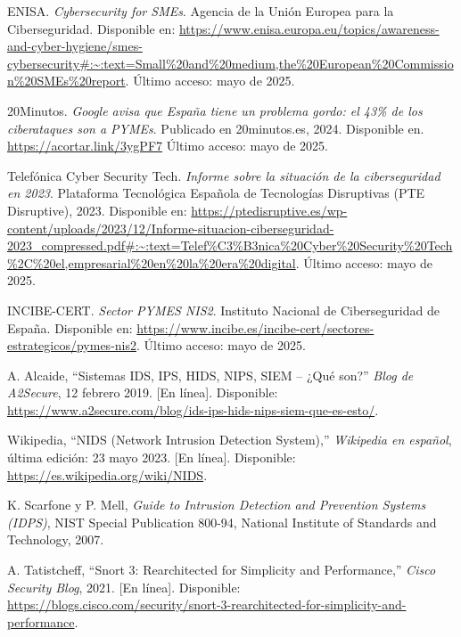 \documentclass[11pt,a4paper,twoside]{report}
\begin{document}
\begin{thebibliography}{99}
	\sloppy 
	
	ENISA. \textit{Cybersecurity for SMEs}. Agencia de la Unión Europea para la Ciberseguridad. Disponible en: \url{https://www.enisa.europa.eu/topics/awareness-and-cyber-hygiene/smes-cybersecurity#:~:text=Small\%20and\%20medium,the\%20European\%20Commission\%20SMEs\%20report}. Último acceso: mayo de 2025.
	
	20Minutos. \textit{Google avisa que España tiene un problema gordo: el 43\% de los ciberataques son a PYMEs}. Publicado en 20minutos.es, 2024. Disponible en. \url{https://acortar.link/3ygPF7}
	 Último acceso: mayo de 2025.
	
	Telefónica Cyber Security Tech. \textit{Informe sobre la situación de la ciberseguridad en 2023}. Plataforma Tecnológica Española de Tecnologías Disruptivas (PTE Disruptive), 2023. Disponible en: \url{https://ptedisruptive.es/wp-content/uploads/2023/12/Informe-situacion-ciberseguridad-2023_compressed.pdf#:~:text=Telef\%C3\%B3nica\%20Cyber\%20Security\%20Tech\%2C\%20el,empresarial\%20en\%20la\%20era\%20digital}. Último acceso: mayo de 2025.
	
	INCIBE-CERT. \textit{Sector PYMES NIS2}. Instituto Nacional de Ciberseguridad de España. Disponible en: \url{https://www.incibe.es/incibe-cert/sectores-estrategicos/pymes-nis2}. Último acceso: mayo de 2025.
	
	 A. Alcaide, “Sistemas IDS, IPS, HIDS, NIPS, SIEM – ¿Qué son?” \textit{Blog de A2Secure}, 12 febrero 2019. [En línea]. Disponible: \url{https://www.a2secure.com/blog/ids-ips-hids-nips-siem-que-es-esto/}.
	
	 Wikipedia, “NIDS (Network Intrusion Detection System),” \textit{Wikipedia en español}, última edición: 23 mayo 2023. [En línea]. Disponible: \url{https://es.wikipedia.org/wiki/NIDS}.
	
	 K. Scarfone y P. Mell, \textit{Guide to Intrusion Detection and Prevention Systems (IDPS)}, NIST Special Publication 800-94, National Institute of Standards and Technology, 2007.
	
	 A. Tatistcheff, “Snort 3: Rearchitected for Simplicity and Performance,” \textit{Cisco Security Blog}, 2021. [En línea]. Disponible: \url{https://blogs.cisco.com/security/snort-3-rearchitected-for-simplicity-and-performance}.
	

\end{thebibliography}
\end{document}
